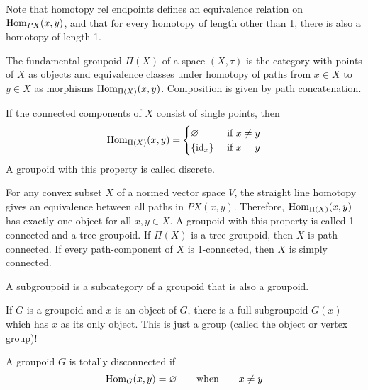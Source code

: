 \documentclass[a5paper]{article}
\begin{document}
Note that homotopy rel endpoints defines an equivalence relation on
$\operatorname{Hom}_{PX}(x,y)$, and that for every homotopy of length other than 1, there is
also a homotopy of length 1.


\begin{definition*}
	The fundamental groupoid $\Pi(X)$ of a space $(X,\tau)$ is the category with
  points of $X$ as objects and equivalence classes under homotopy of paths from
  $x\in X$ to $y\in X$ as morphisms $\operatorname{Hom}_{\Pi(X)}(x,y)$. Composition is 
  given by path concatenation.
\end{definition*}


\begin{example*}
	If the connected components of $X$ consist of single points, then
  \begin{equation*}
    \operatorname{Hom}_{\Pi(X)}(x,y) = \begin{cases}
      \varnothing &\text{ if }x\neq y \\
      \left\{\operatorname{id}_x\right\} &\text{ if }x=y
    \end{cases}
  \end{equation*}
  A groupoid with this property is called discrete.

  For any convex subset $X$ of a normed vector space $V$, the straight line
  homotopy gives an equivalence between all paths in $PX(x,y)$. Therefore,
  $\operatorname{Hom}_{\Pi(X)}(x,y)$ has exactly one object for all $x,y\in X$. A groupoid
  with this property is called 1-connected and a tree groupoid. If $\Pi(X)$ is a
  tree groupoid, then $X$ is path-connected. If every path-component of $X$ is
  1-connected, then $X$ is simply connected.
\end{example*}


\begin{definition}[Subgroupoid]
	A subgroupoid is a subcategory of a groupoid that is also a groupoid.
\end{definition}


If $G$ is a groupoid and $x$ is an object of $G$, there is a full subgroupoid
$G(x)$ which has $x$ as its only object. This is just a group (called the object
or vertex group)!


\begin{definition}
	A groupoid $G$ is totally disconnected if
  \begin{equation*}
    \operatorname{Hom}_G(x,y)=\varnothing\qquad\text{when}\qquad x\neq y
  \end{equation*}
\end{definition}
\end{document}
